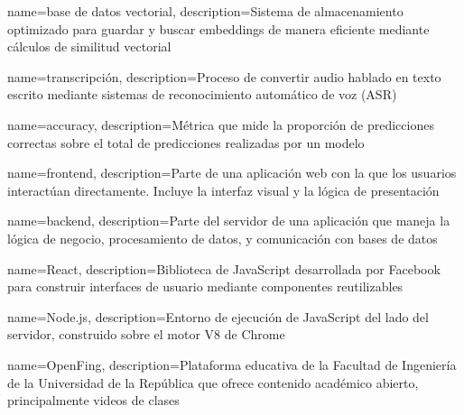 {
    name=base de datos vectorial,
    description={Sistema de almacenamiento optimizado para guardar y buscar embeddings de manera eficiente mediante cálculos de similitud vectorial}
}

{
    name=transcripción,
    description={Proceso de convertir audio hablado en texto escrito mediante sistemas de reconocimiento automático de voz (ASR)}
}

{
    name=accuracy,
    description={Métrica que mide la proporción de predicciones correctas sobre el total de predicciones realizadas por un modelo}
}

{
    name=frontend,
    description={Parte de una aplicación web con la que los usuarios interactúan directamente. Incluye la interfaz visual y la lógica de presentación}
}

{
    name=backend,
    description={Parte del servidor de una aplicación que maneja la lógica de negocio, procesamiento de datos, y comunicación con bases de datos}
}

{
    name=React,
    description={Biblioteca de JavaScript desarrollada por Facebook para construir interfaces de usuario mediante componentes reutilizables}
}

{
    name=Node.js,
    description={Entorno de ejecución de JavaScript del lado del servidor, construido sobre el motor V8 de Chrome}
}

{
    name=OpenFing,
    description={Plataforma educativa de la Facultad de Ingeniería de la Universidad de la República que ofrece contenido académico abierto, principalmente videos de clases}
}



